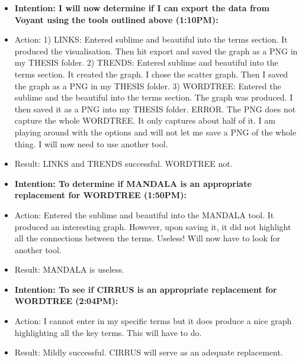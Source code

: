 \documentclass[a4paper,12pt]{article}
\begin{document}
\begin{itemize}
\item \textbf{Intention: I will now determine if I can export the data from Voyant using the tools outlined above (1:10PM):}


\item Action: 1) LINKS: Entered sublime and beautiful into the terms section. It produced the visualisation. Then hit export and saved the graph as a PNG in my THESIS folder. 2) TRENDS: Entered sublime and beautiful into the terms section. It created the graph. I chose the scatter graph. Then I saved the graph as a PNG in my THESIS folder. 3) WORDTREE: Entered the sublime and the beautiful into the terms section. The graph was produced. I then saved it as a PNG into my THESIS folder. ERROR. The PNG does not capture the whole WORDTREE. It only captures about half of it. I am playing around with the options and will not let me save a PNG of the whole thing. I will now need to use another tool. 


\item Result: LINKS and TRENDS successful. WORDTREE not. 


\item \textbf{Intention: To determine if MANDALA is an appropriate replacement for WORDTREE (1:50PM):}


\item Action: Entered the sublime and beautiful into the MANDALA tool. It produced an interesting graph. However, upon saving it, it did not highlight all the connections between the terms. Useless! Will now have to look for another tool.


\item Result: MANDALA is useless. 


\item \textbf{Intention: To see if CIRRUS is an appropriate replacement for WORDTREE (2:04PM):}


\item Action: I cannot enter in my specific terms but it does produce a nice graph highlighting all the key terms. This will have to do. 


\item Result: Mildly successful. CIRRUS will serve as an adequate replacement. 










\end {itemize}
\end{document}
